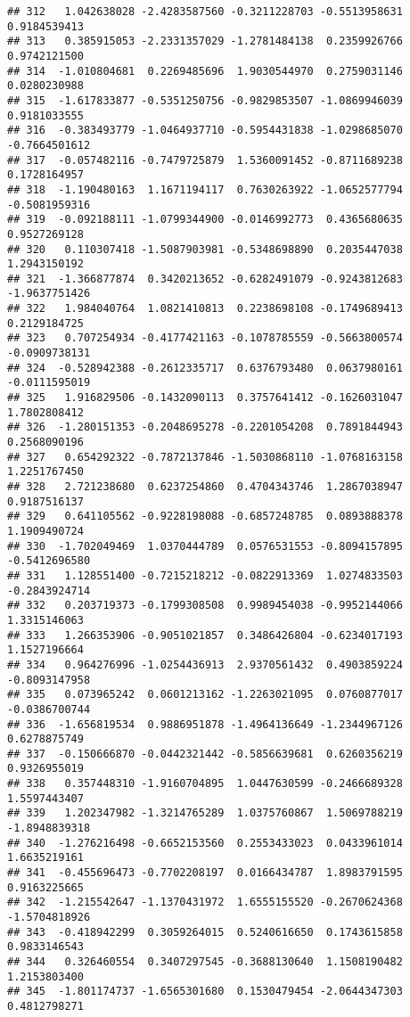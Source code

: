 \documentclass[
]{article}
\begin{document}
\begin{verbatim}
## 312   1.042638028 -2.4283587560 -0.3211228703 -0.5513958631  0.9184539413
## 313   0.385915053 -2.2331357029 -1.2781484138  0.2359926766  0.9742121500
## 314  -1.010804681  0.2269485696  1.9030544970  0.2759031146  0.0280230988
## 315  -1.617833877 -0.5351250756 -0.9829853507 -1.0869946039  0.9181033555
## 316  -0.383493779 -1.0464937710 -0.5954431838 -1.0298685070 -0.7664501612
## 317  -0.057482116 -0.7479725879  1.5360091452 -0.8711689238  0.1728164957
## 318  -1.190480163  1.1671194117  0.7630263922 -1.0652577794 -0.5081959316
## 319  -0.092188111 -1.0799344900 -0.0146992773  0.4365680635  0.9527269128
## 320   0.110307418 -1.5087903981 -0.5348698890  0.2035447038  1.2943150192
## 321  -1.366877874  0.3420213652 -0.6282491079 -0.9243812683 -1.9637751426
## 322   1.984040764  1.0821410813  0.2238698108 -0.1749689413  0.2129184725
## 323   0.707254934 -0.4177421163 -0.1078785559 -0.5663800574 -0.0909738131
## 324  -0.528942388 -0.2612335717  0.6376793480  0.0637980161 -0.0111595019
## 325   1.916829506 -0.1432090113  0.3757641412 -0.1626031047  1.7802808412
## 326  -1.280151353 -0.2048695278 -0.2201054208  0.7891844943  0.2568090196
## 327   0.654292322 -0.7872137846 -1.5030868110 -1.0768163158  1.2251767450
## 328   2.721238680  0.6237254860  0.4704343746  1.2867038947  0.9187516137
## 329   0.641105562 -0.9228198088 -0.6857248785  0.0893888378  1.1909490724
## 330  -1.702049469  1.0370444789  0.0576531553 -0.8094157895 -0.5412696580
## 331   1.128551400 -0.7215218212 -0.0822913369  1.0274833503 -0.2843924714
## 332   0.203719373 -0.1799308508  0.9989454038 -0.9952144066  1.3315146063
## 333   1.266353906 -0.9051021857  0.3486426804 -0.6234017193  1.1527196664
## 334   0.964276996 -1.0254436913  2.9370561432  0.4903859224 -0.8093147958
## 335   0.073965242  0.0601213162 -1.2263021095  0.0760877017 -0.0386700744
## 336  -1.656819534  0.9886951878 -1.4964136649 -1.2344967126  0.6278875749
## 337  -0.150666870 -0.0442321442 -0.5856639681  0.6260356219  0.9326955019
## 338   0.357448310 -1.9160704895  1.0447630599 -0.2466689328  1.5597443407
## 339   1.202347982 -1.3214765289  1.0375760867  1.5069788219 -1.8948839318
## 340  -1.276216498 -0.6652153560  0.2553433023  0.0433961014  1.6635219161
## 341  -0.455696473 -0.7702208197  0.0166434787  1.8983791595  0.9163225665
## 342  -1.215542647 -1.1370431972  1.6555155520 -0.2670624368 -1.5704818926
## 343  -0.418942299  0.3059264015  0.5240616650  0.1743615858  0.9833146543
## 344   0.326460554  0.3407297545 -0.3688130640  1.1508190482  1.2153803400
## 345  -1.801174737 -1.6565301680  0.1530479454 -2.0644347303  0.4812798271

\end{verbatim}
\end{document}
